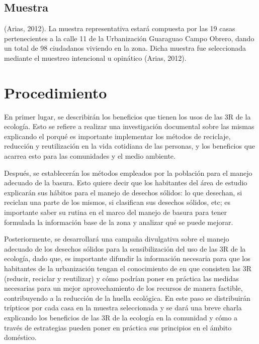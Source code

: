 \subsection{Muestra}

 (Arias, 2012). La muestra representativa estará compuesta por las 19 casas pertenecientes a la calle 11 de la Urbanización Guaraguao Campo Obrero, dando un total de 98 ciudadanos viviendo en la zona. Dicha muestra fue seleccionada mediante el muestreo intencional u opinático  (Arias, 2012).

\section{Procedimiento}

En primer lugar, se describirán los beneficios que tienen los usos de las 3R de la ecología. Esto se refiere a realizar una investigación documental sobre las mismas explicando el porqué es importante implementar los métodos de reciclaje, reducción y reutilización en la vida cotidiana de las personas, y los beneficios que acarrea esto para las comunidades y el medio ambiente.

Después, se establecerán los métodos empleados por la población para el manejo adecuado de la basura. Esto quiere decir que los habitantes del área de estudio explicarán sus hábitos para el manejo de desechos sólidos: lo que desechan, si reciclan una parte de los mismos, si clasifican sus desechos sólidos, etc; es importante saber su rutina en el marco del manejo de basura para tener formulada la información base de la zona y analizar qué se puede mejorar.

Posteriormente, se desarrollará una campaña divulgativa sobre el manejo adecuado de los desechos sólidos para la sensibilización del uso de las 3R de la ecología, dado que, es importante difundir la información necesaria para que los habitantes de la urbanización tengan el conocimiento de en que consisten las 3R (reducir, reciclar y reutilizar) y cómo podrían poner en práctica las medidas necesarias para un mejor aprovechamiento de los recursos de manera factible, contribuyendo a la reducción de la huella ecológica. En este paso se distribuirán trípticos por cada casa en la muestra seleccionada y se dará una breve charla explicando los beneficios de las 3R de la ecología en la comunidad y cómo a través de estrategias pueden poner en práctica sus principios en el ámbito doméstico.

